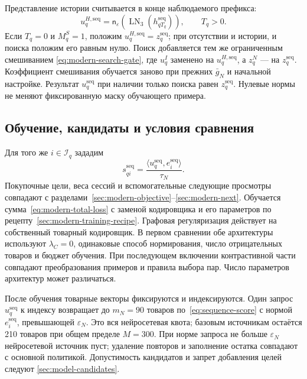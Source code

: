\documentclass[12pt,a4paper]{article}
\newcommand{\eps}{\varepsilon}
\theoremstyle{plainru}
\begin{document}
Представление истории считывается в конце наблюдаемого префикса:
\begin{equation}\label{eq:sequence-readout}
u_q^{H,\mathrm{seq}}
=\mathsf n_\eps\!\left(
\operatorname{LN}_3(h_{qT_q}^{\mathrm{seq}})\right),
\qquad T_q>0.
\end{equation}
Если $T_q=0$ и $M_q^S=1$, положим
$u_q^{H,\mathrm{seq}}=z_q^{\mathrm{seq}}$;
при отсутствии и истории, и поиска положим его равным нулю.
Поиск добавляется тем же ограниченным смешиванием
\eqref{eq:modern-search-gate}, где $u_q^I$ заменено на
$u_q^{H,\mathrm{seq}}$, а $z_q^N$ --- на $z_q^{\mathrm{seq}}$.
Коэффициент смешивания обучается заново при прежних $\bar g_N$
и начальной настройке. Результат $u_q^{\mathrm{seq}}$ при наличии
только поиска равен $z_q^{\mathrm{seq}}$. Нулевые нормы не меняют
фиксированную маску обучающего примера.

\subsection{Обучение, кандидаты и условия сравнения}
\label{sec:sequence-training}

Для того же $i\in\mathcal I_q$ зададим
\begin{equation}\label{eq:sequence-score}
s_{qi}^{\mathrm{seq}}
=\frac{\langle u_q^{\mathrm{seq}},e_i^{\mathrm{seq}}\rangle}{\tau_N}.
\end{equation}
Покупочные цели, веса сессий и вспомогательные следующие просмотры
совпадают с разделами~\ref{sec:modern-objective}--\ref{sec:modern-next}.
Обучается сумма~\eqref{eq:modern-total-loss}
с заменой кодировщика и его параметров по
рецепту~\ref{sec:modern-training-recipe}.
Графовая регуляризация действует на собственный товарный кодировщик.
В первом сравнении обе архитектуры используют $\lambda_C=0$,
одинаковые способ нормирования, число отрицательных товаров и бюджет
обучения. При последующем включении контрастивной части совпадают
преобразования примеров и правила выбора пар. Число параметров
архитектур может различаться.

После обучения товарные векторы фиксируются и индексируются.
Один запрос $u_q^{\mathrm{seq}}$ к индексу возвращает до $m_N=90$
товаров по~\eqref{eq:sequence-score}
с нормой $e_i^{\mathrm{seq}}$, превышающей $\eps_N$.
Это вся нейросетевая квота; базовым источникам остаётся 210 товаров
при общем пределе $M=300$.
При норме запроса не больше $\eps_N$ нейросетевой источник пуст;
удаление повторов и заполнение остатка совпадают с основной политикой.
Допустимость кандидатов и запрет добавления целей следуют
\ref{sec:model-candidates}.
\end{document}
